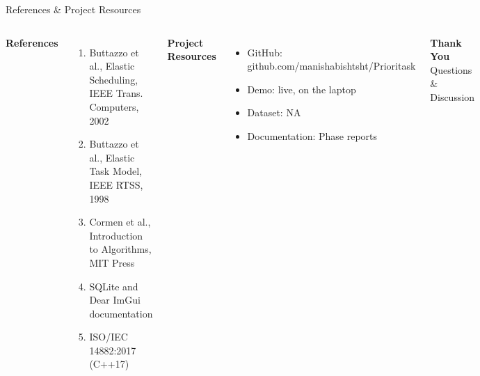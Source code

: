 \documentclass[aspectratio=169,11pt]{beamer}
\begin{document}
\begin{frame}{References \& Project Resources}

\begin{columns}[T,totalwidth=\textwidth]


\textbf{\color{GEUBlue}References}

\begin{enumerate}\itemsep3pt
    \item Buttazzo et al., Elastic Scheduling, IEEE Trans. Computers, 2002
    \item Buttazzo et al., Elastic Task Model, IEEE RTSS, 1998
    \item Cormen et al., Introduction to Algorithms, MIT Press
    \item SQLite and Dear ImGui documentation
    \item ISO/IEC 14882:2017 (C++17)
\end{enumerate}


\textbf{\color{GEUBlue}Project Resources}

\begin{itemize}\itemsep3pt
    \item GitHub:\\ {\scriptsize github.com/manishabishtsht/Prioritask}
    \item Demo: live, on the laptop
    \item Dataset: NA
    \item Documentation: Phase reports
\end{itemize}

\vfill

\begin{center}

\colorbox{GEUBlue}{
\parbox{.82\textwidth}{
\centering
\color{white}
\Large\textbf{Thank You}\\[1mm]
\normalsize Questions \& Discussion
}}

\end{center}

\end{columns}

\end{frame}
\end{document}
